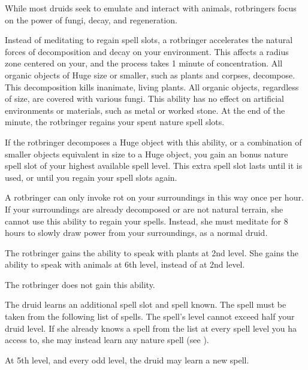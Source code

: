             While most druids seek to emulate and interact with animals, rotbringers focus on the power of fungi, decay, and regeneration.

             Instead of meditating to regain spell slots, a rotbringer accelerates the natural forces of decomposition and decay on your environment.
            This affects a \areahuge radius zone centered on your, and the process takes 1 minute of concentration.
            All organic objects of Huge size or smaller, such as plants and corpses, decompose.
            This decomposition kills inanimate, living plants.
            All organic objects, regardless of size, are covered with various fungi.
            This ability has no effect on artificial environments or materials, such as metal or worked stone.
            At the end of the minute, the rotbringer regains your spent nature spell slots.

            If the rotbringer decomposes a Huge object with this ability, or a combination of smaller objects equivalent in size to a Huge object, you gain an bonus nature spell slot of your highest available spell level.
            This extra spell slot lasts until it is used, or until you regain your spell slots again.

            A rotbringer can only invoke rot on your surroundings in this way once per hour.
            If your surroundings are already decomposed or are not natural terrain, she cannot use this ability to regain your spells.
            Instead, she must meditate for 8 hours to slowly draw power from your surroundings, as a normal druid.

             The rotbringer gains the ability to speak with plants at 2nd level.
            She gains the ability to speak with animals at 6th level, instead of at 2nd level.

             The rotbringer does not gain this ability.

             The druid learns an additional spell slot and spell known.
            The spell must be taken from the following list of spells.
            The spell's level cannot exceed half your druid level.
            If she already knows a spell from the list at every spell level you ha access to, she may instead learn any nature spell (see ).

            At 5th level, and every odd level, the druid may learn a new spell.

